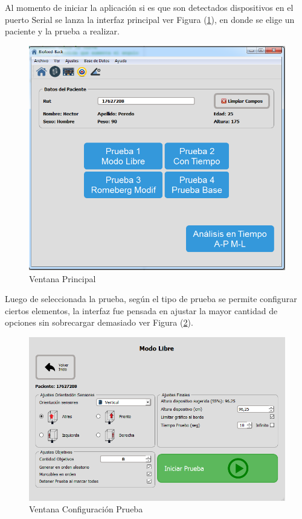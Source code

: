 \documentclass[12pt,a4paper]{article}
\begin{document}
Al momento de iniciar la aplicación si es que son detectados dispositivos en el puerto Serial se lanza la interfaz principal ver Figura (\ref{fig:mainwindow}), en donde se elige un paciente y la prueba a realizar.

\begin{figure}[H]
	\centering
	\includegraphics[scale=0.6]{images/mainwindow}
	\caption{Ventana Principal}
	\label{fig:mainwindow}
\end{figure}

Luego de seleccionada la prueba, según el tipo de prueba se permite configurar ciertos elementos, la interfaz fue pensada en ajustar la mayor cantidad de opciones sin sobrecargar demasiado ver Figura (\ref{fig:configurarPrueba}).

\begin{figure}[H]
	\centering
	\includegraphics[scale=0.6]{images/configurarPrueba}
	\caption{Ventana Configuración Prueba}
	\label{fig:configurarPrueba}
\end{figure}
\end{document}
